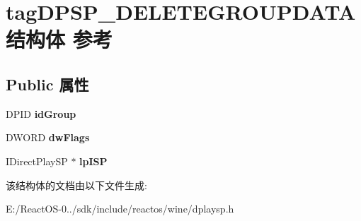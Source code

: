\hypertarget{structtag_d_p_s_p___d_e_l_e_t_e_g_r_o_u_p_d_a_t_a}{}\section{tag\+D\+P\+S\+P\+\_\+\+D\+E\+L\+E\+T\+E\+G\+R\+O\+U\+P\+D\+A\+T\+A结构体 参考}
\label{structtag_d_p_s_p___d_e_l_e_t_e_g_r_o_u_p_d_a_t_a}
\subsection*{Public 属性}
\begin{DoxyCompactItemize}
\item 
\mbox{\label{structtag_d_p_s_p___d_e_l_e_t_e_g_r_o_u_p_d_a_t_a_aa16ebd9469157ce743ed757d4c3cd0c8}} 
D\+P\+ID {\bfseries id\+Group}
\item 
\mbox{\label{structtag_d_p_s_p___d_e_l_e_t_e_g_r_o_u_p_d_a_t_a_a522da0cb5f836233ed11de39d08e7dd8}} 
D\+W\+O\+RD {\bfseries dw\+Flags}
\item 
\mbox{\label{structtag_d_p_s_p___d_e_l_e_t_e_g_r_o_u_p_d_a_t_a_acd865ba09f63e6cc922a5c23b485f43b}} 
I\+Direct\+Play\+SP $\ast$ {\bfseries lp\+I\+SP}
\end{DoxyCompactItemize}


该结构体的文档由以下文件生成\+:\begin{DoxyCompactItemize}
\item 
E\+:/\+React\+O\+S-\/0../sdk/include/reactos/wine/dplaysp.\+h\end{DoxyCompactItemize}
